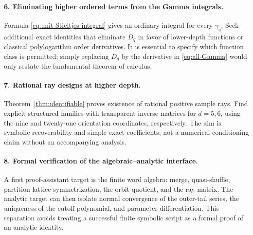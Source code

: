 \documentclass[11pt]{article}
\numberwithin{equation}{section}
\theoremstyle{definition}
\begin{document}
\paragraph{6. Eliminating higher ordered terms from the Gamma integrals.}
Formula \eqref{eq:unit-Stieltjes-integral} gives an ordinary integral for
every $\gamma_q$. Seek additional exact identities that eliminate $D_q$
in favor of lower-depth functions or classical polylogarithm order
derivatives. It is essential to specify which function class is permitted;
simply replacing $D_q$ by the derivative in \eqref{eq:all-Gamma} would
only restate the fundamental theorem of calculus.

\paragraph{7. Rational ray designs at higher depth.}
Theorem~\ref{thm:identifiable} proves existence of rational positive sample
rays. Find explicit structured families with transparent inverse matrices
for $d=5,6$, using the nine and twenty-one orientation coordinates,
respectively. The aim is symbolic recoverability and simple exact
coefficients, not a numerical conditioning claim without an accompanying
analysis.

\paragraph{8. Formal verification of the algebraic--analytic interface.}
A first proof-assistant target is the finite word algebra: merge,
quasi-shuffle, partition-lattice symmetrization, the orbit quotient, and
the ray matrix. The analytic target can then isolate normal convergence
of the outer-tail series, the uniqueness of the cutoff polynomial, and
parameter differentiation. This separation avoids treating a successful
finite symbolic script as a formal proof of an analytic identity.

\appendix
\end{document}
